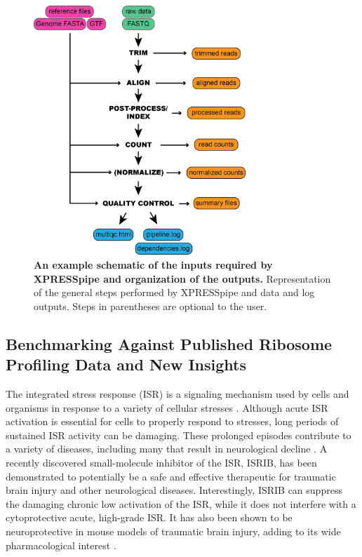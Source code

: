 \documentclass[10pt, oneside]{article}
\begin{document}
\begin{multicols}{2}
\begin{figure}
\centering
  \includegraphics[width=80mm]{figures/xpresspipe_figure1.png}
  \caption{\textbf{An example schematic of the inputs required by XPRESSpipe and organization of the outputs.} Representation of the general steps performed by XPRESSpipe and data and log outputs. Steps in parentheses are optional to the user.}
  \label{fig:outputs}
\end{figure}


\subsection*{Benchmarking Against Published Ribosome Profiling Data and New Insights}
The integrated stress response (ISR) is a signaling mechanism used by cells and organisms in response to a variety of cellular stresses \cite{harding_isr}. Although acute ISR activation is essential for cells to properly respond to stresses, long periods of sustained ISR activity can be damaging. These prolonged episodes contribute to a variety of diseases, including many that result in neurological decline \cite{isr_disease}. A recently discovered small-molecule inhibitor of the ISR, ISRIB, has been demonstrated to potentially be a safe and effective therapeutic for traumatic brain injury and other neurological diseases. Interestingly, ISRIB can suppress the damaging chronic low activation of the ISR, while it does not interfere with a cytoprotective acute, high-grade ISR. It has also been shown to be neuroprotective in mouse models of traumatic brain injury, adding to its wide pharmacological interest \cite{isrib_activation, isrib_structure, isrib_riboseq, isrib_neuroprotective, isrib_neuroprotective2, isrib_neuroprotective3, isrib_neuroprotective4}. \par


\end{multicols}
\end{document}
